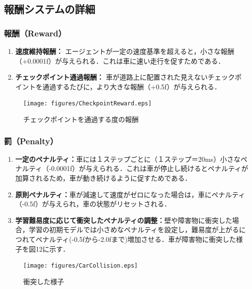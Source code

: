 \subsection{報酬システムの詳細}
\subsubsection{報酬（Reward）}
\begin{enumerate}
  \item \textbf{速度維持報酬：}
エージェントが一定の速度基準を超えると，小さな報酬（+0.0001f）が与えられる．これは車に速い走行を促すためである．
  \item \textbf{チェックポイント通過報酬：}
車が道路上に配置された見えないチェックポイントを通過するたびに，より大きな報酬（+0.5f）が与えられる．
\end{enumerate}

\begin{figure}[H]
    \centering
    \texttt{[image: figures/CheckpointReward.eps]} %
    \caption{チェックポイントを通過する度の報酬} %
    \label{fig:checkpoint-reward} %
\end{figure}

\subsubsection{罰（Penalty）}
\begin{enumerate}
  \item \textbf{一定のペナルティ：}車には１ステップごとに（１ステップ＝20ms）小さなペナルティ（-0.0001f）が与えられる．これは車が停止し続けるとペナルティが加算されるため，車が動き続けるように促すためである．
  \item \textbf{原則ペナルティ：}車が減速して速度がゼロになった場合は，車にペナルティ（-0.5f）が与えられ，車の状態がリセットされる．
  \item \textbf{学習難易度に応じて衝突したペナルティの調整：}壁や障害物に衝突した場合，学習の初期モデルでは小さめなペナルティを設定し，難易度が上がるにつれてペナルティ(-0.5fから-2.0fまで)増加させる．車が障害物に衝突した様子を図12に示す．
\end{enumerate}

\begin{figure}[H]
    \centering
    \texttt{[image: figures/CarCollision.eps]} %
    \caption{衝突した様子} %
    \label{fig:car-collision} %
\end{figure}

